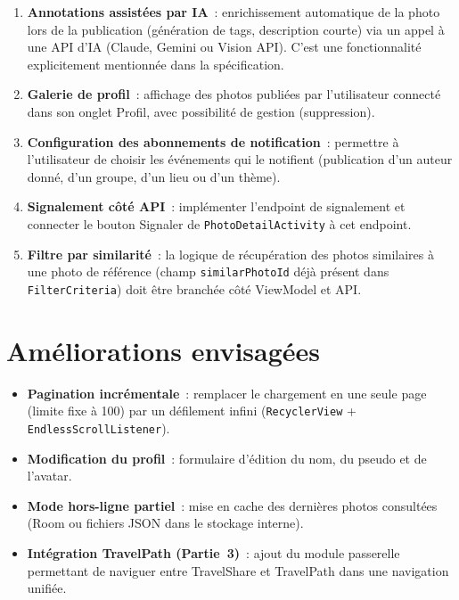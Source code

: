 \documentclass[12pt, a4paper]{report}
\begin{document}
\begin{warningbox}
\begin{enumerate}[leftmargin=*]
  \item \textbf{Annotations assistées par IA}~: enrichissement automatique de la photo
        lors de la publication (génération de tags, description courte) via un appel à
        une API d'IA (Claude, Gemini ou Vision API). C'est une fonctionnalité explicitement
        mentionnée dans la spécification.

  \item \textbf{Galerie de profil}~: affichage des photos publiées par l'utilisateur
        connecté dans son onglet Profil, avec possibilité de gestion (suppression).

  \item \textbf{Configuration des abonnements de notification}~: permettre à l'utilisateur
        de choisir les événements qui le notifient (publication d'un auteur donné, d'un
        groupe, d'un lieu ou d'un thème).

  \item \textbf{Signalement côté API}~: implémenter l'endpoint de signalement et connecter
        le bouton Signaler de \texttt{PhotoDetailActivity} à cet endpoint.

  \item \textbf{Filtre par similarité}~: la logique de récupération des photos similaires
        à une photo de référence (champ \texttt{similarPhotoId} déjà présent dans
        \texttt{FilterCriteria}) doit être branchée côté ViewModel et API.
\end{enumerate}
\end{warningbox}

\section{Améliorations envisagées}

\begin{itemize}
  \item \textbf{Pagination incrémentale}~: remplacer le chargement en une seule page
        (limite fixe à 100) par un défilement infini (\texttt{RecyclerView} +
        \texttt{EndlessScrollListener}).
  \item \textbf{Modification du profil}~: formulaire d'édition du nom, du pseudo et de
        l'avatar.
  \item \textbf{Mode hors-ligne partiel}~: mise en cache des dernières photos consultées
        (Room ou fichiers JSON dans le stockage interne).
  \item \textbf{Intégration TravelPath (Partie~3)}~: ajout du module passerelle permettant
        de naviguer entre TravelShare et TravelPath dans une navigation unifiée.
\end{itemize}
\end{document}
